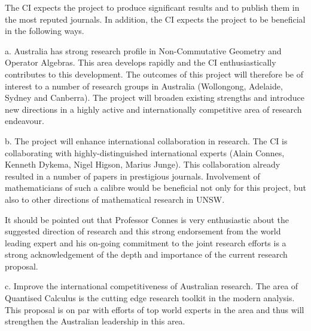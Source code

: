 \documentclass[12pt]{article}
\newcommand{\archeading}[1]{\vspace{.3cm} \noindent{\bfseries #1} \vspace{.1cm}   }
\begin{document}
\bigskip\archeading{Benefit}

The CI expects the project to produce significant results and to publish them in the most reputed journals. In addition, the CI expects the project to be beneficial in the following ways.

a. Australia has strong research profile in Non-Commutative Geometry and Operator Algebras. This area develops rapidly and the CI enthusiastically contributes to this development. The outcomes of this project will therefore be of interest to a number of research groups in Australia (Wollongong, Adelaide, Sydney and Canberra). The project will broaden existing strengths and introduce new directions in a highly active and internationally competitive area of research endeavour. 





b. The project will enhance international collaboration in research. The CI is collaborating with highly-distinguished international experts (Alain Connes, Kenneth Dykema, Nigel Higson, Marius Junge). This collaboration already resulted in a number of papers in prestigious journals. Involvement of mathematicians of such a calibre would be beneficial not only for this project, but also to other directions of mathematical research in UNSW.

It should be pointed out that Professor Connes is very enthusiastic about the suggested direction of research and this strong endorsement from the world leading expert and his on-going commitment to the joint research efforts is a strong acknowledgement of the depth and importance of the current research proposal.

c. Improve the international competitiveness of Australian research. The area of Quantised Calculus is the cutting edge research toolkit in the modern analysis. This proposal is on par with efforts of top world experts in the area and thus will strengthen the Australian leadership in this area.
\end{document}
